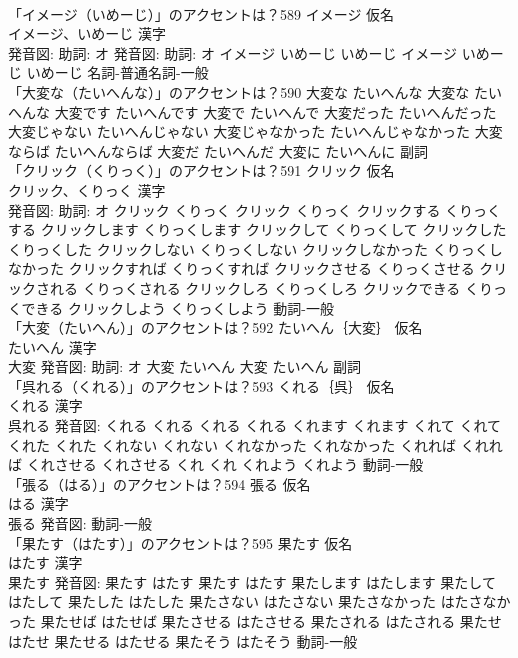 \documentclass[8pt]{extreport}
\begin{document}
\begin{CJK}{UTF8}{min}
\\	「イメージ（いめーじ）」のアクセントは？589	イメージ 仮名　
\\	イメージ、いめーじ 漢字　
\\	発音図: 助詞: オ 発音図: 助詞: オ	イメージ いめーじ いめーじ		イメージ いめーじ いめーじ				名詞-普通名詞-一般 
\\	「大変な（たいへんな）」のアクセントは？590		大変な たいへんな		大変な たいへんな 大変です たいへんです 大変で たいへんで 大変だった たいへんだった 大変じゃない たいへんじゃない 大変じゃなかった たいへんじゃなかった 大変ならば たいへんならば 大変だ たいへんだ 大変に たいへんに				副詞 
\\	「クリック（くりっく）」のアクセントは？591	クリック 仮名　
\\	クリック、くりっく 漢字　
\\	発音図: 助詞: オ	クリック くりっく		クリック くりっく クリックする くりっくする クリックします くりっくします クリックして くりっくして クリックした くりっくした クリックしない くりっくしない クリックしなかった くりっくしなかった クリックすれば くりっくすれば クリックさせる くりっくさせる クリックされる くりっくされる クリックしろ くりっくしろ クリックできる くりっくできる クリックしよう くりっくしよう				動詞-一般 
\\	「大変（たいへん）」のアクセントは？592	たいへん｛大変｝ 仮名　
\\	たいへん 漢字　
\\	大変 発音図: 助詞: オ	大変 たいへん		大変 たいへん				副詞 
\\	「呉れる（くれる）」のアクセントは？593	くれる｛呉｝ 仮名　
\\	くれる 漢字　
\\	呉れる 発音図:	くれる くれる		くれる くれる くれます くれます くれて くれて くれた くれた くれない くれない くれなかった くれなかった くれれば くれれば くれさせる くれさせる くれ くれ くれよう くれよう				動詞-一般 
\\	「張る（はる）」のアクセントは？594	張る 仮名　
\\	はる 漢字　
\\	張る 発音図:							動詞-一般 
\\	「果たす（はたす）」のアクセントは？595	果たす 仮名　
\\	はたす 漢字　
\\	果たす 発音図:	果たす はたす		果たす はたす 果たします はたします 果たして はたして 果たした はたした 果たさない はたさない 果たさなかった はたさなかった 果たせば はたせば 果たさせる はたさせる 果たされる はたされる 果たせ はたせ 果たせる はたせる 果たそう はたそう				動詞-一般 

\end{CJK}
\end{document}
